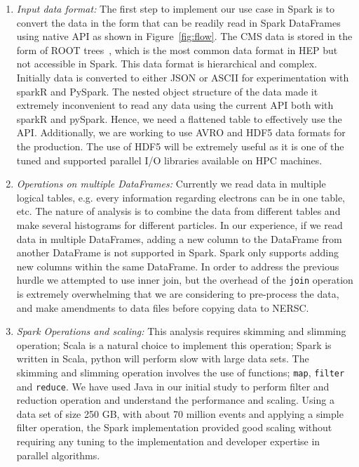 \documentclass[11pt, twocolumn]{article}
\begin{document}
\begin{enumerate}
\item \textit{Input data format: } 
The first step to implement our use case in Spark is to convert the data in the form that 
can be readily read in Spark DataFrames using native API as shown in Figure~\ref{fig:flow}. 
The CMS data is stored in the form of ROOT trees~\cite{root}, which is the most common 
data format in HEP but not accessible in Spark. 
This data format is hierarchical and complex. Initially data is converted to either 
JSON or ASCII for experimentation with sparkR and PySpark. 
The nested object structure of the data made it extremely inconvenient to read 
any data using the current API both with sparkR and pySpark. 
Hence, we need a flattened table to effectively use the API. 
Additionally, we are working to use AVRO and HDF5 data formats for the production. 
The use of HDF5 will be extremely useful as it is one of the tuned and supported 
parallel I/O libraries available on HPC machines. 

\item \textit{Operations on multiple DataFrames: } 
Currently we read data in multiple logical tables, e.g. every information regarding 
electrons can be in one table, etc. The nature of analysis is to combine the data from different tables 
and make several histograms for different particles. 
In our experience, if we read data in multiple DataFrames, 
adding a new column to the DataFrame from another 
DataFrame is not supported in Spark. Spark only supports adding new columns within the same DataFrame. 
In order to address the previous hurdle we attempted to use inner join, but the overhead of the 
\texttt{join} operation is extremely overwhelming that we are considering to pre-process the data, and 
make amendments to data files before copying data to NERSC. 

\item \textit{Spark Operations and scaling: } 
This analysis requires skimming and slimming operation; Scala is a natural choice 
to implement this operation; Spark is written in Scala, python will perform slow with large data sets.  
The skimming and slimming operation involves the use of functions; \texttt{map}, \texttt{filter} and 
\texttt{reduce}. 
We have used Java in our initial study to perform filter and reduction 
operation and understand the performance and scaling. Using a data set of size 250 GB, 
with about 70 million events and applying a simple filter operation, 
the Spark implementation provided good
  scaling without requiring any tuning to the implementation and
  developer expertise in parallel algorithms. 


\end{enumerate}
\end{document}
